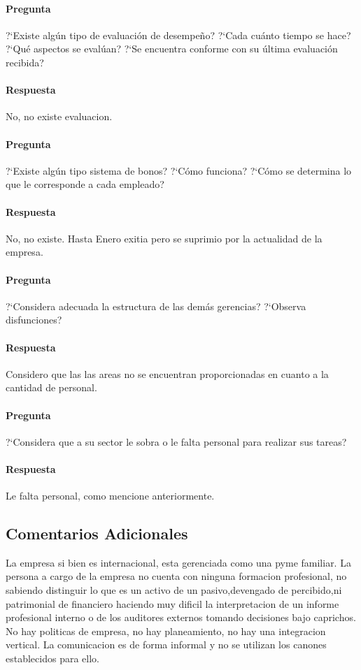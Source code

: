 \documentclass[12pt,a4paper,spanish]{article}
\begin{document}
	\paragraph{Pregunta}
	 ?`Existe alg\'un tipo de evaluaci\'on de desempe\~{n}o?  ?`Cada cu\'anto tiempo se hace?  ?`Qu\'e aspectos se eval\'uan?  ?`Se encuentra conforme con su \'ultima evaluaci\'on recibida?
	\paragraph{Respuesta}
No, no existe evaluacion.

	\paragraph{Pregunta}
	 ?`Existe alg\'un tipo sistema de bonos?  ?`C\'omo funciona?  ?`C\'omo se determina lo que le corresponde a cada empleado?
	\paragraph{Respuesta}
No, no existe. Hasta Enero exitia pero se suprimio por la actualidad de la empresa.

	\paragraph{Pregunta}
	 ?`Considera adecuada la estructura de las dem\'as gerencias?  ?`Observa disfunciones?
	\paragraph{Respuesta}
Considero que las las areas no se encuentran proporcionadas en cuanto a la cantidad de personal.

	\paragraph{Pregunta}
	 ?`Considera que a su sector le sobra o le falta personal para realizar sus tareas?
	\paragraph{Respuesta}
	Le falta personal, como mencione anteriormente.

\subsection{Comentarios Adicionales}
La empresa si bien es internacional, esta gerenciada como una pyme familiar.
La persona a cargo de la empresa no cuenta con ninguna formacion profesional, no sabiendo distinguir lo que es un activo de un pasivo,devengado de percibido,ni patrimonial de financiero haciendo muy dificil la interpretacion de un informe profesional interno o de los auditores externos tomando decisiones bajo caprichos.
No hay politicas de empresa, no hay planeamiento, no hay una integracion vertical. La comunicacion es de forma informal y no se utilizan los canones establecidos para ello.
\end{document}
